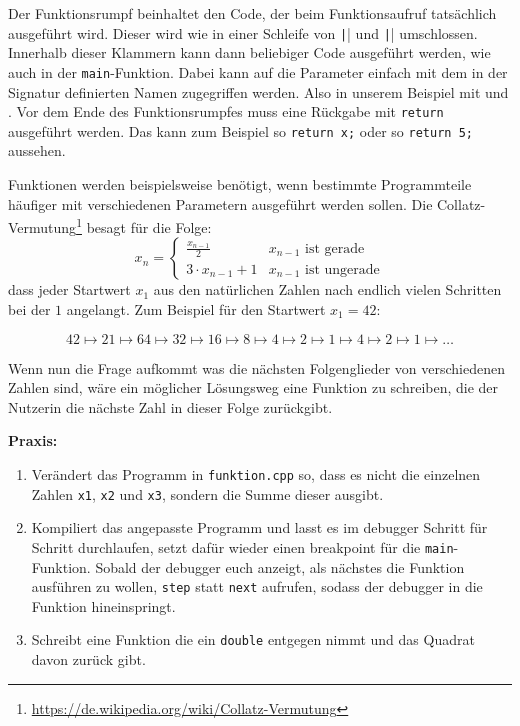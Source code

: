 Der Funktionsrumpf beinhaltet den Code, der beim Funktionsaufruf tatsächlich ausgeführt wird.
Dieser wird wie in einer Schleife von \texttt|{| und \texttt|}| umschlossen.
Innerhalb dieser Klammern kann dann beliebiger Code ausgeführt werden, wie auch in der \texttt{main}-Funktion.
Dabei kann auf die Parameter einfach mit dem in der Signatur definierten Namen zugegriffen werden.
Also in unserem Beispiel mit  und .
Vor dem Ende des Funktionsrumpfes muss eine Rückgabe mit \texttt{return} ausgeführt werden.
Das kann zum Beispiel so \texttt{return x;} oder so \texttt{return 5;} aussehen.

Funktionen werden beispielsweise benötigt, wenn bestimmte Programmteile häufiger mit verschiedenen Parametern ausgeführt werden sollen.
Die Collatz-Vermutung\footnote{\url{https://de.wikipedia.org/wiki/Collatz-Vermutung}} besagt für die Folge:
\[
	x_n =
	\begin{cases}
		\frac{x_{n-1}}{2} & x_{n-1} \text{ ist gerade} \\
		3 \cdot x_{n-1} + 1 & x_{n-1} \text{ ist ungerade}
	\end{cases}
\]
dass jeder Startwert $x_1$ aus den natürlichen Zahlen nach endlich vielen Schritten bei der $1$ angelangt.
Zum Beispiel für den Startwert $x_1 = 42$:

\[
    42 \mapsto 21 \mapsto 64 \mapsto 32 \mapsto 16 \mapsto 8 \mapsto 4 \mapsto 2 \mapsto 1 \mapsto 4 \mapsto 2 \mapsto 1 \mapsto \ldots
\]

Wenn nun die Frage aufkommt was die nächsten Folgenglieder von verschiedenen Zahlen sind, wäre ein möglicher Lösungsweg eine Funktion zu schreiben, die der Nutzerin die nächste Zahl in dieser Folge zurückgibt.


\textbf{Praxis:}
\begin{enumerate}
	\item Verändert das Programm in \texttt{funktion.cpp} so, dass es nicht die einzelnen Zahlen \texttt{x1}, \texttt{x2} und \texttt{x3}, sondern die Summe dieser ausgibt.
	\item Kompiliert das angepasste Programm und lasst es im debugger Schritt für Schritt durchlaufen, setzt dafür wieder einen breakpoint für die \texttt{main}-Funktion.
	    Sobald der debugger euch anzeigt, als nächstes die Funktion ausführen zu wollen, \texttt{step} statt \texttt{next} aufrufen, sodass der debugger in die Funktion hineinspringt.
	\item Schreibt eine Funktion die ein \texttt{double} entgegen nimmt und das Quadrat davon zurück gibt.
\end{enumerate}

